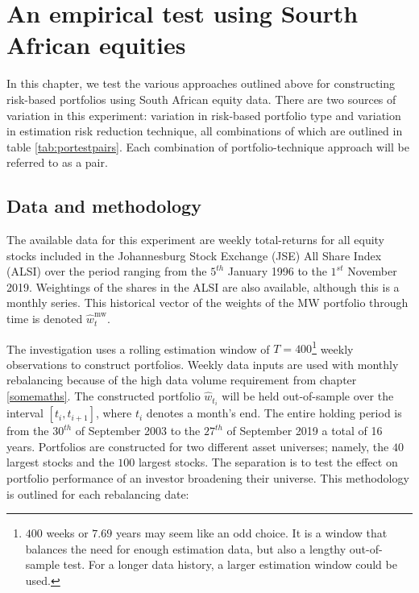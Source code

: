 \documentclass[
]{article}
\begin{document}
\hypertarget{experiment}{%
\section{An empirical test using Sourth African equities}\label{experiment}}

In this chapter, we test the various approaches outlined above for constructing risk-based portfolios
using South African equity data. There are two sources of variation in this experiment: variation in
risk-based portfolio type and variation in estimation risk reduction technique, all combinations of
which are outlined in table \ref{tab:portestpairs}. Each combination of portfolio-technique approach
will be referred to as a pair.

\hypertarget{data-and-methodology}{%
\subsection{Data and methodology}\label{data-and-methodology}}

The available data for this experiment are weekly total-returns for all equity stocks included in the
Johannesburg Stock Exchange (JSE) All Share Index (ALSI) over the period ranging from the \(5^{th}\)
January 1996 to the \(1^{st}\) November 2019. Weightings of the shares in the ALSI are also available,
although this is a monthly series. This historical vector of the weights of the MW portfolio through
time is denoted \(\hat{w}^{\text{mw}}_t\).

The investigation uses a rolling estimation window of \(T = 400\)\footnote{\(400\) weeks or \(7.69\) years
  may seem like an odd choice. It is a window that balances the need for enough estimation data, but also
  a lengthy out-of-sample test. For a longer data history, a larger estimation window could be used.}
weekly observations to construct portfolios. Weekly data inputs are used with monthly rebalancing
because of the high data volume requirement from chapter \ref{somemaths}. The constructed portfolio
\(\hat{w}_{t_i}\) will be held out-of-sample over the interval \([t_i, t_{i + 1}]\), where \(t_i\) denotes a
month's end. The entire holding period is from the \(30^{th}\) of September 2003 to the \(27^{th}\) of
September 2019 a total of 16 years. Portfolios are constructed for two different asset universes;
namely, the \(40\) largest stocks and the \(100\) largest stocks. The separation is to test the effect on
portfolio performance of an investor broadening their universe. This methodology is outlined for each
rebalancing date:
\end{document}
